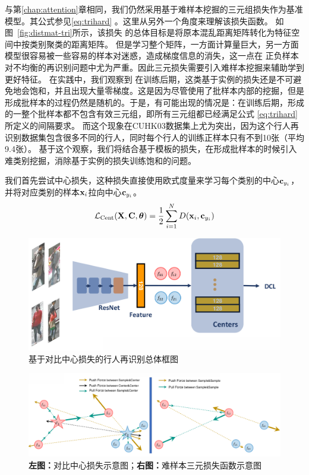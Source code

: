 与第\ref{chap:attention}章相同，我们仍然采用基于难样本挖掘的三元组损失作为基准模型。其公式参见\ref{eq:trihard} 。这里从另外一个角度来理解该损失函数。 如图~\ref{fig:distmat-tri}所示，该损失
的总体目标是将原本混乱距离矩阵转化为特征空间中按类别聚类的距离矩阵。
但是学习整个矩阵，一方面计算量巨大，另一方面模型很容易被一些容易的样本对迷惑，造成梯度信息的消失，这一点在
正负样本对不均衡的再识别问题中尤为严重。因此三元损失需要引入难样本挖掘来辅助学到更好特征。
在实践中，我们观察到
在训练后期，这类基于实例的损失还是不可避免地会饱和，并且出现大量零梯度。这是因为尽管使用了批样本内部的挖掘，但是形成批样本的过程仍然是随机的。于是，有可能出现的情况是：在训练后期，形成的一整个批样本都不包含有效三元组，即所有三元组都已经满足公式
\ref{eq:trihard}
所定义的间隔要求。
而这个现象在CUHK03数据集上尤为突出，因为这个行人再识别数据集包含很多不同的行人，同时每个行人的训练正样本只有不到10张（平均9.4张）。
基于这个观察，我们将结合基于模板的损失，在形成批样本的时候引入难类别挖掘，消除基于实例的损失训练饱和的问题。

我们首先尝试中心损失，这种损失直接使用欧式度量来学习每个类别的中心${\mathbf{c}}_{y_i}$，并将对应类别的样本${\mathbf{x}}_i$拉向中心${\mathbf{c}}_{y_i}$。
\begin{equation}
	\mathcal{L}_{\textrm{Cent}} ({\mathbf{X}}, {\mathbf{C}}, {\boldsymbol{\theta}}) = \frac{1}{2}
	\sum_{i=1}^{N}  D(
	{\mathbf{x}}_i , {\mathbf{c}}_{y_i} )
\end{equation}

\begin{figure}
	\centering
	\includegraphics[width=\textwidth]{fig/2018-05-19-22-25-00.png}
	\caption{
		基于对比中心损失的行人再识别总体框图
	}
	\label{fig:dcent}
\end{figure}

\begin{figure}
	\centering
	\includegraphics[width=1.1\textwidth]{fig/2018-05-19-22-25-11.png}
	\caption{
		\textbf{左图：}对比中心损失示意图；\textbf{右图：}难样本三元损失函数示意图
	}
	\label{fig:dcent2}
\end{figure}

